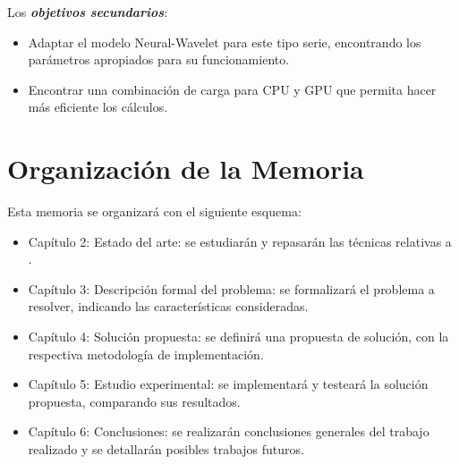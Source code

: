 Los \emph{\textbf{objetivos secundarios}}:
\begin{itemize}
	\item Adaptar el modelo Neural-Wavelet para este tipo serie, encontrando
los parámetros apropiados para su funcionamiento.
	\item Encontrar una combinación de carga para CPU y GPU que permita hacer
más eficiente los cálculos.
\end{itemize}

\section{Organización de la Memoria}

Esta memoria se organizará con el siguiente esquema:
\begin{itemize}
	\item Capítulo 2: Estado del arte: se estudiarán y repasarán las técnicas
relativas a .
	\item Capítulo 3: Descripción formal del problema: se formalizará el
problema a resolver, indicando las características consideradas.
	\item Capítulo 4: Solución propuesta: se definirá una propuesta de
solución, con la respectiva metodología de implementación. 
	\item Capítulo 5: Estudio experimental: se implementará y testeará la
solución propuesta, comparando sus resultados.
	\item Capítulo 6: Conclusiones: se realizarán conclusiones generales del
trabajo realizado y se detallarán posibles trabajos futuros.
\end{itemize}

